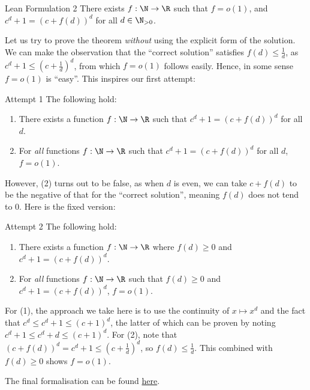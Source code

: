 \documentclass{article}[11px]
\begin{document}
\begin{theorem}{Lean Formulation 2}{}
There exists \(f : \N \to \R\) such that \(f = o(1)\), and \(c^d + 1 = (c + f(d))^d\) for all \(d \in \N_{> 0}\).
\end{theorem}

Let us try to prove the theorem \textit{without} using the explicit form of the solution. We can make the observation that the ``correct solution'' satisfies \(f(d) \leq \frac{1}{d}\), as \(c^d + 1 \leq \left(c + \frac{1}{d}\right)^d\), from which \(f = o(1)\) follows easily. Hence, in some sense \(f = o(1)\) is ``easy''. This inspires our first attempt:

\begin{theorem}{Attempt 1}{}
The following hold:
\begin{enumerate}[(1)]
  \item There exists a function \(f : \N \to \R\) such that \(c^d + 1 = (c + f(d))^d\) for all \(d\).
  \item For \textit{all} functions \(f : \N \to \R\) such that \(c^d + 1 = (c + f(d))^d\) for all \(d\), \(f = o(1)\).
\end{enumerate}
\end{theorem}

However, (2) turns out to be false, as when \(d\) is even, we can take \(c + f(d)\) to be the negative of that for the ``correct solution'', meaning \(f(d)\) does not tend to \(0\). Here is the fixed version:

\begin{theorem}{\ok Attempt 2}{}
The following hold:
\begin{enumerate}[(1)]
  \item There exists a function \(f : \N \to \R\) where \(f(d) \geq 0\) and \(c^d + 1 = (c + f(d))^d\).
  \item For \textit{all} functions \(f : \N \to \R\) such that \(f(d) \geq 0\) and \(c^d + 1 = (c + f(d))^d\), \(f = o(1)\).
\end{enumerate}
\end{theorem}

For (1), the approach we take here is to use the continuity of \(x \mapsto x^d\) and the fact that \(c^d \leq c^d + 1 \leq (c + 1)^d\), the latter of which can be proven by noting \(c^d + 1 \leq c^d + d \leq (c + 1)^d\). For (2), note that \((c + f(d))^d = c^d + 1 \leq \left(c + \frac{1}{d}\right)^d\), so \(f(d) \leq \frac{1}{d}\). This combined with \(f(d) \geq 0\) shows \(f = o(1)\).

The final formalisation can be found \href{https://gist.github.com/grhkm21/cc839b7d3c0f0d29a1b8c84e4ba8347b}{here}.
\end{document}
